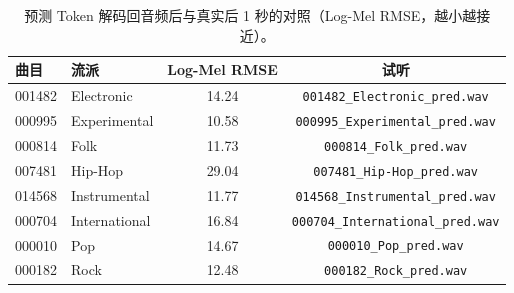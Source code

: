 \begin{table}[H]
\centering\small
\caption{预测 Token 解码回音频后与真实后 1 秒的对照（Log-Mel RMSE，越小越接近）。}
\label{tab:tokensamples}
\begin{tabular}{llcc}
\toprule
曲目 & 流派 & Log-Mel RMSE & 试听\\
\midrule
001482 & Electronic & 14.24 & \texttt{001482\_Electronic\_pred.wav}\\
000995 & Experimental & 10.58 & \texttt{000995\_Experimental\_pred.wav}\\
000814 & Folk & 11.73 & \texttt{000814\_Folk\_pred.wav}\\
007481 & Hip-Hop & 29.04 & \texttt{007481\_Hip-Hop\_pred.wav}\\
014568 & Instrumental & 11.77 & \texttt{014568\_Instrumental\_pred.wav}\\
000704 & International & 16.84 & \texttt{000704\_International\_pred.wav}\\
000010 & Pop & 14.67 & \texttt{000010\_Pop\_pred.wav}\\
000182 & Rock & 12.48 & \texttt{000182\_Rock\_pred.wav}\\
\bottomrule
\end{tabular}
\end{table}

